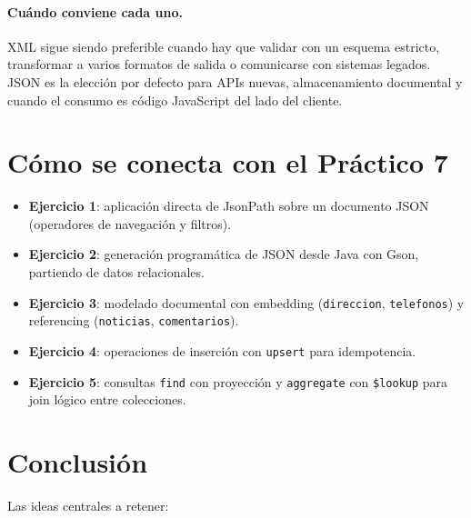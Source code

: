 \documentclass[11pt,a4paper]{article}
\begin{document}
\paragraph{Cuándo conviene cada uno.} XML sigue siendo preferible cuando
hay que validar con un esquema estricto, transformar a varios formatos
de salida o comunicarse con sistemas legados. JSON es la elección por
defecto para APIs nuevas, almacenamiento documental y cuando el
consumo es código JavaScript del lado del cliente.

\section{Cómo se conecta con el Práctico 7}

\begin{itemize}
    \item \textbf{Ejercicio 1}: aplicación directa de JsonPath sobre un
    documento JSON (operadores de navegación y filtros).
    \item \textbf{Ejercicio 2}: generación programática de JSON desde
    Java con Gson, partiendo de datos relacionales.
    \item \textbf{Ejercicio 3}: modelado documental con embedding
    (\texttt{direccion}, \texttt{telefonos}) y referencing
    (\texttt{noticias}, \texttt{comentarios}).
    \item \textbf{Ejercicio 4}: operaciones de inserción con
    \texttt{upsert} para idempotencia.
    \item \textbf{Ejercicio 5}: consultas \texttt{find} con proyección y
    \texttt{aggregate} con \texttt{\$lookup} para join lógico entre
    colecciones.
\end{itemize}

\section{Conclusión}

Las ideas centrales a retener:
\end{document}
